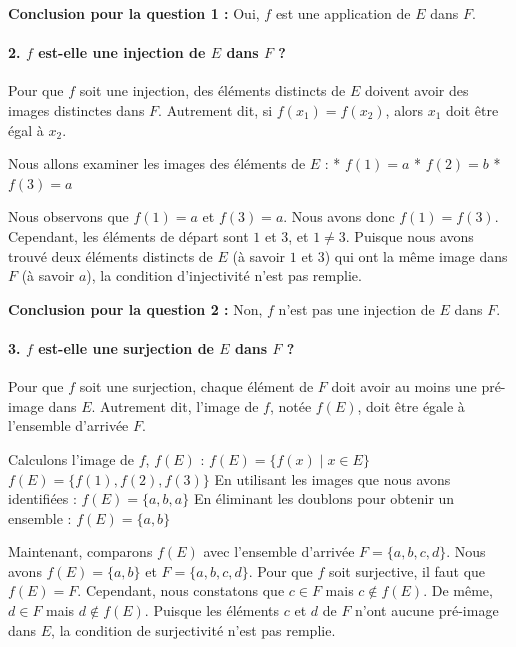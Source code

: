 \documentclass[12pt,a4paper]{report}
\begin{document}
\textbf{Conclusion pour la question 1 :} Oui, \(f\) est une application
de \(E\) dans \(F\).

\paragraph{\texorpdfstring{2. \(f\) est-elle une injection de \(E\) dans
\(F\)
?}{2. f est-elle une injection de E dans F ?}}\label{f-est-elle-une-injection-de-e-dans-f}

Pour que \(f\) soit une injection, des éléments distincts de \(E\)
doivent avoir des images distinctes dans \(F\). Autrement dit, si
\(f(x_1) = f(x_2)\), alors \(x_1\) doit être égal à \(x_2\).

Nous allons examiner les images des éléments de \(E\) : * \(f(1) = a\) *
\(f(2) = b\) * \(f(3) = a\)

Nous observons que \(f(1) = a\) et \(f(3) = a\). Nous avons donc
\(f(1) = f(3)\). Cependant, les éléments de départ sont \(1\) et \(3\),
et \(1 \neq 3\). Puisque nous avons trouvé deux éléments distincts de
\(E\) (à savoir \(1\) et \(3\)) qui ont la même image dans \(F\) (à
savoir \(a\)), la condition d'injectivité n'est pas remplie.

\textbf{Conclusion pour la question 2 :} Non, \(f\) n'est pas une
injection de \(E\) dans \(F\).

\paragraph{\texorpdfstring{3. \(f\) est-elle une surjection de \(E\)
dans \(F\)
?}{3. f est-elle une surjection de E dans F ?}}\label{f-est-elle-une-surjection-de-e-dans-f}

Pour que \(f\) soit une surjection, chaque élément de \(F\) doit avoir
au moins une pré-image dans \(E\). Autrement dit, l'image de \(f\),
notée \(f(E)\), doit être égale à l'ensemble d'arrivée \(F\).

Calculons l'image de \(f\), \(f(E)\) : \(f(E) = \{f(x) \mid x \in E\}\)
\(f(E) = \{f(1), f(2), f(3)\}\) En utilisant les images que nous avons
identifiées : \(f(E) = \{a, b, a\}\) En éliminant les doublons pour
obtenir un ensemble : \(f(E) = \{a, b\}\)

Maintenant, comparons \(f(E)\) avec l'ensemble d'arrivée
\(F = \{a, b, c, d\}\). Nous avons \(f(E) = \{a, b\}\) et
\(F = \{a, b, c, d\}\). Pour que \(f\) soit surjective, il faut que
\(f(E) = F\). Cependant, nous constatons que \(c \in F\) mais
\(c \notin f(E)\). De même, \(d \in F\) mais \(d \notin f(E)\). Puisque
les éléments \(c\) et \(d\) de \(F\) n'ont aucune pré-image dans \(E\),
la condition de surjectivité n'est pas remplie.
\end{document}
